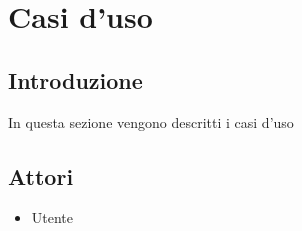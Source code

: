 \section{Casi d'uso}
    \subsection{Introduzione}
    In questa sezione vengono descritti i casi d'uso 
    \subsection{Attori}
    \begin{itemize}
        \item Utente
    \end{itemize}
    
    \pagebreak
    
    \pagebreak
    
    \pagebreak
    
    \pagebreak
    
    \pagebreak
    
    \pagebreak
    
    \pagebreak
    
    \pagebreak
    
    \pagebreak
    